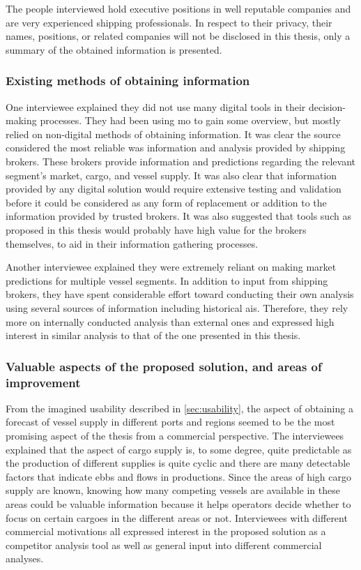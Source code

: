 The people interviewed hold executive positions in well reputable companies and are very experienced shipping professionals. In respect to their privacy, their names, positions, or related companies will not be disclosed in this thesis, only a summary of the obtained information is presented.

\subsubsection{Existing methods of obtaining information}

One interviewee explained they did not use many digital tools in their decision-making processes. They had been using \acrfull{mo} to gain some overview, but mostly relied on non-digital methods of obtaining information. It was clear the source considered the most reliable was information and analysis provided by shipping brokers. These brokers provide information and predictions regarding the relevant segment's market, cargo, and vessel supply. It was also clear that information provided by any digital solution would require extensive testing and validation before it could be considered as any form of replacement or addition to the information provided by trusted brokers. It was also suggested that tools such as proposed in this thesis would probably have high value for the brokers themselves, to aid in their information gathering processes.

Another interviewee explained they were extremely reliant on making market predictions for multiple vessel segments. In addition to input from shipping brokers, they have spent considerable effort toward conducting their own analysis using several sources of information including historical \acrshort{ais}. Therefore, they rely more on internally conducted analysis than external ones and expressed high interest in similar analysis to that of the one presented in this thesis.

\subsubsection{Valuable aspects of the proposed solution, and areas of improvement}

From the imagined usability described in \cref{sec:usability}, the aspect of obtaining a forecast of vessel supply in different ports and regions seemed to be the most promising aspect of the thesis from a commercial perspective. The interviewees explained that the aspect of cargo supply is, to some degree, quite predictable as the production of different supplies is quite cyclic and there are many detectable factors that indicate ebbs and flows in productions. Since the areas of high cargo supply are known, knowing how many competing vessels are available in these areas could be valuable information because it helps operators decide whether to focus on certain cargoes in the different areas or not. Interviewees with different commercial motivations all expressed interest in the proposed solution as a competitor analysis tool as well as general input into different commercial analyses.

